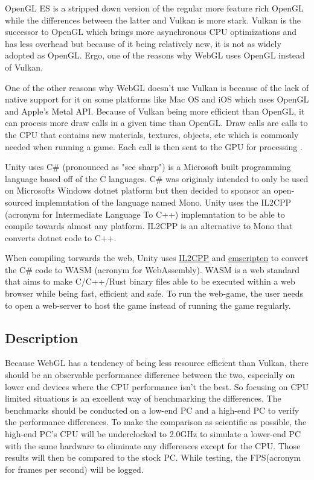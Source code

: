 \documentclass{article}
\begin{document}
OpenGL ES is a stripped down version of the regular more feature rich OpenGL while the differences between the latter and Vulkan is more stark. Vulkan is the successor to OpenGL which brings more asynchronous CPU optimizations and has less overhead but because of it being relatively new, it is not as widely adopted as OpenGL. Ergo, one of the reasons why WebGL uses OpenGL instead of Vulkan.

One of the other reasons why WebGL doesn’t use Vulkan is because of the lack of native support for it on some platforms like Mac OS and iOS which uses OpenGL and Apple’s Metal API. Because of Vulkan being more efficient than OpenGL, it can process more draw calls in a given time than OpenGL. Draw calls are calls to the CPU that contains new materials, textures, objects, etc which is commonly needed when running a game. Each call is then sent to the GPU for processing \cite{DrawCalls}.

Unity uses C\# (pronounced as "see sharp") is a Microsoft built programming language based off of the C languages. C\# was originaly intended to only be used on Microsofts Windows dotnet platform but then decided to sponsor an open-sourced implemntation of the language named Mono\cite{CSharpWiki}. Unity uses the IL2CPP (acronym for Intermediate Language To C++) implemntation to be able to compile towards almost any platform. IL2CPP is an alternative to Mono that converts dotnet code to C++\cite{IL2CPP}.

When compiling torwards the web, Unity uses \href{https://docs.unity3d.com/Manual/IL2CPP.html}{IL2CPP} and \href{https://emscripten.org/}{emscripten} to convert the C\# code to WASM (acronym for WebAssembly)\cite{WebGL}. WASM is a web standard that aims to make C/C++/Rust binary files able to be executed within a web browser while being fast, efficient and safe\cite{WebAssembly}. To run the web-game, the user needs to open a web-server to host the game instead of running the game regularly.

\subsection {Description}
Because WebGL has a tendency of being less resource efficient than Vulkan, there should be an observable performance difference between the two, especially on lower end devices where the CPU performance isn’t the best. So focusing on CPU limited situations is an excellent way of benchmarking the differences. The benchmarks should be conducted on a low-end PC and a high-end PC to verify the performance differences.
To make the comparison as scientific as possible, the high-end PC’s CPU will be underclocked to 2.0GHz to simulate a lower-end PC with the same hardware to eliminate any differences except for the CPU. Those results will then be compared to the stock PC. While testing, the FPS(acronym for frames per second) will be logged.
\end{document}
